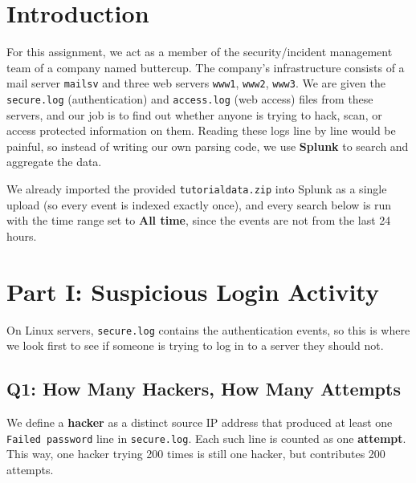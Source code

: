     \tableofcontents
    \thispagestyle{empty}
    \clearpage


    \section{Introduction}

        For this assignment, we act as a member of the security/incident management team of a company named
        buttercup. The company's infrastructure consists of a mail server \texttt{mailsv} and three web servers
        \texttt{www1}, \texttt{www2}, \texttt{www3}. We are given the \texttt{secure.log} (authentication) and
        \texttt{access.log} (web access) files from these servers, and our job is to find out whether anyone is
        trying to hack, scan, or access protected information on them. Reading these logs line by line would be
        painful, so instead of writing our own parsing code, we use \textbf{Splunk} to search and aggregate the
        data.

        We already imported the provided \texttt{tutorialdata.zip} into Splunk as a single upload (so every event
        is indexed exactly once), and every search below is run with the time range set to \textbf{All time}, since
        the events are not from the last 24 hours.

    \section{Part I: Suspicious Login Activity}

        On Linux servers, \texttt{secure.log} contains the authentication events, so this is where we look first
        to see if someone is trying to log in to a server they should not.

        \subsection[Hackers]{Q1: How Many Hackers, How Many Attempts}

            \begin{defbox}
                We define a \textbf{hacker} as a distinct source IP address that produced at least one
                \texttt{Failed password} line in \texttt{secure.log}. Each such line is counted as one
                \textbf{attempt}. This way, one hacker trying 200 times is still one hacker, but contributes 200
                attempts.
            \end{defbox}

